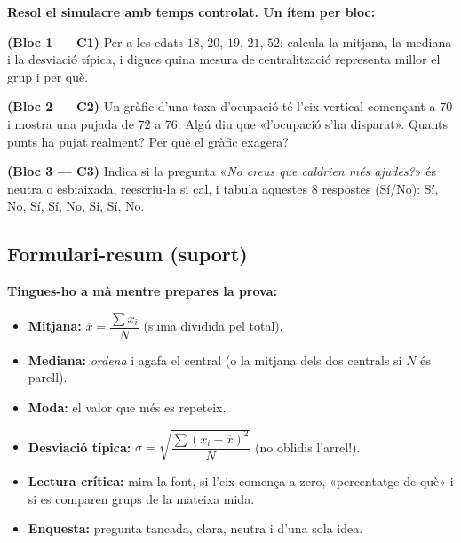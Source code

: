\begin{exercicis}
\textbf{Resol el simulacre amb temps controlat. Un ítem per bloc:}
\begin{exlist}
  \item \textbf{(Bloc 1 — C1)} Per a les edats $18$, $20$, $19$, $21$, $52$: calcula la
        mitjana, la mediana i la desviació típica, i digues quina mesura de
        centralització representa millor el grup i per què.
  \item \textbf{(Bloc 2 — C2)} Un gràfic d'una taxa d'ocupació té l'eix vertical
        començant a $70$ i mostra una pujada de $72$ a $76$. Algú diu que «l'ocupació
        s'ha disparat». Quants punts ha pujat realment? Per què el gràfic exagera?
  \item \textbf{(Bloc 3 — C3)} Indica si la pregunta «\emph{No creus que caldrien més
        ajudes?}» és neutra o esbiaixada, reescriu-la si cal, i tabula aquestes $8$
        respostes (Sí/No): Sí, No, Sí, Sí, No, Sí, Sí, No.
\end{exlist}
\end{exercicis}

\subsection{Formulari-resum (suport)}

\begin{idea}
\textbf{Tingues-ho a mà mentre prepares la prova:}
\begin{itemize}[leftmargin=1.4em, itemsep=2pt]
  \item \textbf{Mitjana:} $\overline{x}=\dfrac{\sum x_i}{N}$ (suma dividida pel total).
  \item \textbf{Mediana:} \emph{ordena} i agafa el central (o la mitjana dels dos
        centrals si $N$ és parell).
  \item \textbf{Moda:} el valor que més es repeteix.
  \item \textbf{Desviació típica:} $\sigma=\sqrt{\dfrac{\sum (x_i-\overline{x})^2}{N}}$
        (no oblidis l'arrel!).
  \item \textbf{Lectura crítica:} mira la font, si l'eix comença a zero, «percentatge
        de què» i si es comparen grups de la mateixa mida.
  \item \textbf{Enquesta:} pregunta tancada, clara, neutra i d'una sola idea.
\end{itemize}
\end{idea}

